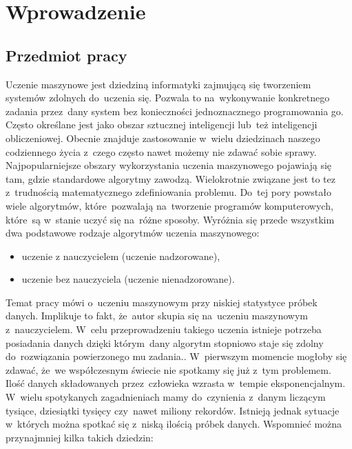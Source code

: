 \section{Wprowadzenie}\label{intro}
\subsection{Przedmiot pracy}\label{matter}
Uczenie maszynowe jest dziedziną informatyki zajmującą się tworzeniem systemów zdolnych do~uczenia się. Pozwala to na~wykonywanie konkretnego zadania przez~dany system bez konieczności jednoznacznego programowania go. 
Często określane jest jako obszar sztucznej inteligencji lub~też inteligencji obliczeniowej\cite{stefanowski}. Obecnie znajduje zastosowanie w~wielu dziedzinach naszego codziennego życia z~czego często nawet możemy nie zdawać sobie sprawy.
Najpopularniejsze obszary wykorzystania uczenia maszynowego pojawiają się tam, gdzie standardowe algorytmy zawodzą. Wielokrotnie związane jest to tez z~trudnością matematycznego zdefiniowania problemu. 
 Do~tej pory powstało wiele algorytmów, które~pozwalają na~tworzenie programów komputerowych, które~są w~stanie uczyć się na~różne sposoby. Wyróżnia się przede wszystkim dwa podstawowe rodzaje algorytmów uczenia maszynowego:
\begin{itemize}
\item uczenie z nauczycielem (uczenie nadzorowane),
\item uczenie bez nauczyciela (uczenie nienadzorowane).
\end{itemize}
Temat pracy mówi o~uczeniu maszynowym przy niskiej statystyce próbek danych. Implikuje to fakt, że~autor skupia się na~uczeniu maszynowym z~nauczycielem. W~celu przeprowadzeniu takiego uczenia istnieje potrzeba posiadania danych dzięki którym~dany algorytm stopniowo staje się zdolny do~rozwiązania powierzonego mu zadania..
 W~pierwszym momencie mogłoby się zdawać, że~we współczesnym świecie nie spotkamy się już z~tym problemem. Ilość danych składowanych przez~człowieka wzrasta w~tempie eksponencjalnym. W~wielu spotykanych zagadnieniach mamy do~czynienia z~danym liczącym tysiące, dziesiątki tysięcy czy~nawet miliony rekordów. Istnieją jednak sytuacje w~których można spotkać się z~niską ilością próbek danych. Wspomnieć można przynajmniej kilka takich dziedzin:
